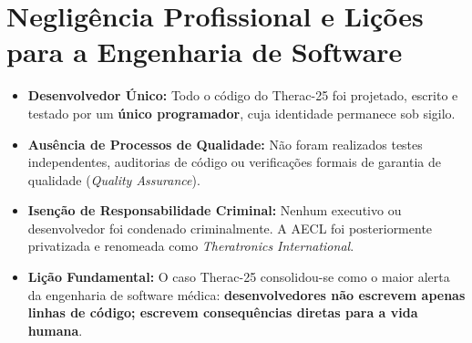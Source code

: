 \documentclass[12pt, a4paper]{article}
\begin{document}
\section{Negligência Profissional e Lições para a Engenharia de Software}

\begin{itemize}
    \item \textbf{Desenvolvedor Único:} Todo o código do Therac-25 foi projetado, escrito e testado por um \textbf{único programador}, cuja identidade permanece sob sigilo.
    \item \textbf{Ausência de Processos de Qualidade:} Não foram realizados testes independentes, auditorias de código ou verificações formais de garantia de qualidade (\textit{Quality Assurance}).
    \item \textbf{Isenção de Responsabilidade Criminal:} Nenhum executivo ou desenvolvedor foi condenado criminalmente. A AECL foi posteriormente privatizada e renomeada como \textit{Theratronics International}.
    \item \textbf{Lição Fundamental:} O caso Therac-25 consolidou-se como o maior alerta da engenharia de software médica: \textbf{desenvolvedores não escrevem apenas linhas de código; escrevem consequências diretas para a vida humana}.
\end{itemize}
\end{document}
